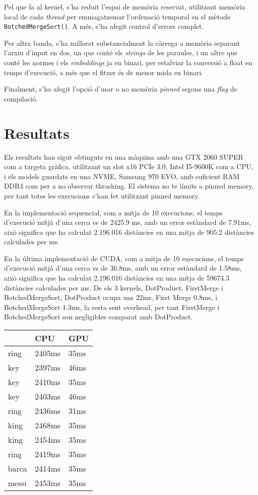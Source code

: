 \documentclass[catalan,10pt,a4paper]{article}
\begin{document}
Pel que fa al kernel, s'ha reduït l'espai de memòria reservat, utilitzant memòria local de cada \textit{thread} per emmagatzemar l'ordenació temporal en el mètode \verb|BotchedMergeSort()|. A més, s'ha afegit control d'errors complet.

Per altra banda, s'ha millorat substancialment la càrrega a memòria separant l'arxiu d'input en dos, un que conté els \textit{strings} de les paraules, i un altre que conté les normes i els \textit{embeddings} ja en binari, per estalviar la conversió a float en temps d'execució, a més que el fitxer és de menor mida en binari.

Finalment, s'ha afegit l'opció d'usar o no memòria \textit{pinned} segons una \textit{flag} de compilació.

\section*{Resultats}

Els resultats han sigut obtinguts en una màquina amb una GTX 2060 SUPER com a targeta gràfica, utilitzant un slot x16 PCIe 3.0, Intel I5-9600K com a CPU, i els models guardats en una NVME, Samsung 970 EVO, amb suficient RAM DDR4 com per a no observar thrashing. El sistema no te límits a pinned memory, per tant totes les execucions s'han fet utilitzant pinned memory.

En la implementació sequencial, com a mitja de 10 execucions, el temps d'execució mitjà d'una cerca es de 2425.9 ms, amb un error estàndard de 7.91ms, això significa que ha calculat 2.196.016 distàncies en una mitja de 905.2 distàncies calculades per ms.

En la última implementació de CUDA, com a mitja de 10 execucions, el temps d'execució mitjà d'una cerca es de 36.8ms, amb un error estàndard de 1.58ms, això significa que ha calculat 2.196.016 distàncies en una mitja de 59674.3 distàncies calculades per ms. De els 3 kernels, DotProduct, FirstMerge i BotchedMergeSort, DotProduct ocupa uns 22ms, First Merge 0.8ms, i BotchedMergeSort 1.3ms, la resta sent overhead, per tant FirstMerge i BotchedMergeSort son negligibles comparat amb DotProduct.


\begin{table}[h]
\centering
\begin{tabular}{|l|l|l|}
\hline
      & CPU  & GPU \\ \hline
ring  & 2405ms & 35ms  \\ \hline
key   & 2397ms & 46ms  \\ \hline
key   & 2410ms & 35ms  \\ \hline
key   & 2403ms & 46ms  \\ \hline
ring  & 2436ms & 31ms  \\ \hline
king  & 2468ms & 35ms  \\ \hline
king  & 2454ms & 35ms  \\ \hline
ring  & 2419ms & 35ms  \\ \hline
barca & 2414ms & 35ms  \\ \hline
messi & 2453ms & 35ms  \\ \hline
\end{tabular}
\end{table}
\end{document}
